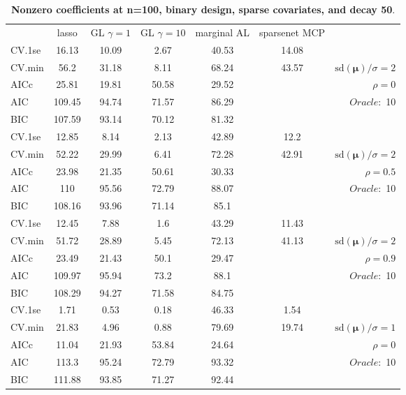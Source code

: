 \begin{table}\vspace{-.5cm}
\caption[l]{ { \bf Nonzero coefficients at n=100, binary design, 
sparse covariates, and  decay  50}.}
\vspace{-.5cm}
\footnotesize{}
\begin{center}
\begin{tabular}{l*{5}{c}|r}
& lasso & GL $\gamma=1$ & GL $\gamma=10$ & marginal AL & sparsenet MCP  & \\
 \cline{1-7}
CV.1se & 16.13 & 10.09 & 2.67 & 40.53 & 14.08 & \\
CV.min & 56.2 & 31.18 & 8.11 & 68.24 & 43.57 &  $\mathrm{sd}(\mathbf{\mu})/\sigma=2$ \\
AICc & 25.81 & 19.81 & 50.58 & 29.52 & & $\rho=0$ \\
AIC & 109.45 & 94.74 & 71.57 & 86.29 & &  \multirow{2}{*}{$Oracle: $ 10} \\
BIC & 107.59 & 93.14 & 70.12 & 81.32 & &  \\
 \hline 
CV.1se & 12.85 & 8.14 & 2.13 & 42.89 & 12.2 & \\
CV.min & 52.22 & 29.99 & 6.41 & 72.28 & 42.91 &  $\mathrm{sd}(\mathbf{\mu})/\sigma=2$ \\
AICc & 23.98 & 21.35 & 50.61 & 30.33 & & $\rho=0.5$ \\
AIC & 110 & 95.56 & 72.79 & 88.07 & &  \multirow{2}{*}{$Oracle: $ 10} \\
BIC & 108.16 & 93.96 & 71.14 & 85.1 & &  \\
 \hline 
CV.1se & 12.45 & 7.88 & 1.6 & 43.29 & 11.43 & \\
CV.min & 51.72 & 28.89 & 5.45 & 72.13 & 41.13 &  $\mathrm{sd}(\mathbf{\mu})/\sigma=2$ \\
AICc & 23.49 & 21.43 & 50.1 & 29.47 & & $\rho=0.9$ \\
AIC & 109.97 & 95.94 & 73.2 & 88.1 & &  \multirow{2}{*}{$Oracle: $ 10} \\
BIC & 108.29 & 94.27 & 71.58 & 84.75 & &  \\
 \hline 
CV.1se & 1.71 & 0.53 & 0.18 & 46.33 & 1.54 & \\
CV.min & 21.83 & 4.96 & 0.88 & 79.69 & 19.74 &  $\mathrm{sd}(\mathbf{\mu})/\sigma=1$ \\
AICc & 11.04 & 21.93 & 53.84 & 24.64 & & $\rho=0$ \\
AIC & 113.3 & 95.24 & 72.79 & 93.32 & &  \multirow{2}{*}{$Oracle: $ 10} \\
BIC & 111.88 & 93.85 & 71.27 & 92.44 & &  \\

\end{tabular}
\end{center}
\end{table}
